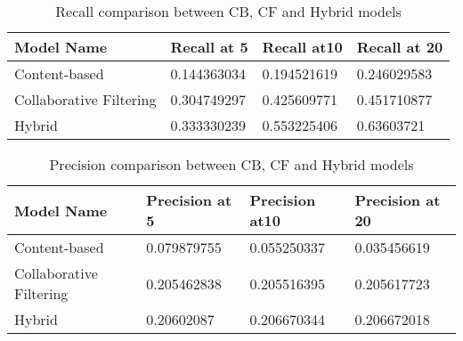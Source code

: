 \begin{table}[H]
\begin{tabular}{|l|l|l|l|}
\hline
\rowcolor[HTML]{C0C0C0} 
{\color[HTML]{000000} \textbf{Model   Name}}   & {\color[HTML]{000000} \textbf{Recall at 5}} & {\color[HTML]{000000} \textbf{Recall at10}} & {\color[HTML]{000000} \textbf{Recall at 20}} \\ \hline
{\color[HTML]{000000} Content-based}           & {\color[HTML]{000000} 0.144363034}          & {\color[HTML]{000000} 0.194521619}          & {\color[HTML]{000000} 0.246029583}           \\ \hline
{\color[HTML]{000000} Collaborative Filtering} & {\color[HTML]{000000} 0.304749297}          & {\color[HTML]{000000} 0.425609771}          & {\color[HTML]{000000} 0.451710877}           \\ \hline
{\color[HTML]{000000} Hybrid}                  & {\color[HTML]{000000} 0.333330239}          & {\color[HTML]{000000} 0.553225406}          & {\color[HTML]{000000} 0.63603721}            \\ \hline
\end{tabular}
\caption{Recall comparison between CB, CF and Hybrid models}
\label{tb:recall}
\end{table}
\vspace{-2em}
\begin{table}[H]
\begin{tabular}{|l|l|l|l|}
\hline
\rowcolor[HTML]{C0C0C0} 
{\color[HTML]{000000} \textbf{Model   Name}}   & {\color[HTML]{000000} \textbf{Precision at 5}} & {\color[HTML]{000000} \textbf{Precision at10}} & {\color[HTML]{000000} \textbf{Precision at 20}} \\ \hline
{\color[HTML]{000000} Content-based}           & {\color[HTML]{000000} 0.079879755}             & {\color[HTML]{000000} 0.055250337}             & {\color[HTML]{000000} 0.035456619}              \\ \hline
{\color[HTML]{000000} Collaborative Filtering} & {\color[HTML]{000000} 0.205462838}             & {\color[HTML]{000000} 0.205516395}             & {\color[HTML]{000000} 0.205617723}              \\ \hline
{\color[HTML]{000000} Hybrid}                  & {\color[HTML]{000000} 0.20602087}              & {\color[HTML]{000000} 0.206670344}             & {\color[HTML]{000000} 0.206672018}              \\ \hline
\end{tabular}
\caption{Precision comparison between CB, CF and Hybrid models}
\label{tb:precision}
\end{table}
